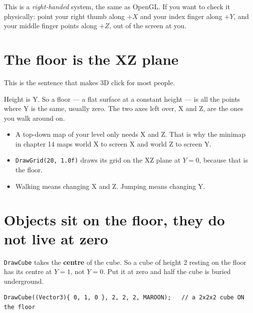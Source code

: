 This is a \emph{right-handed} system, the same as OpenGL. If you want to check it
physically: point your right thumb along $+X$ and your index finger along $+Y$,
and your middle finger points along $+Z$, out of the screen at you.


\section{The floor is the XZ plane}

This is the sentence that makes 3D click for most people.

Height is Y. So a floor --- a flat surface at a constant height --- is all the
points where Y is the same, usually zero. The two axes left over, X and Z, are
the ones you walk around on.

\begin{itemize}[leftmargin=*,itemsep=2pt]
  \item A top-down map of your level only needs X and Z. That is why the minimap
        in chapter 14 maps world X to screen X and world Z to screen Y.
  \item \lstinline|DrawGrid(20, 1.0f)| draws its grid on the XZ plane at
        $Y = 0$, because that is the floor.
  \item Walking means changing X and Z. Jumping means changing Y.
\end{itemize}


\section{Objects sit on the floor, they do not live at zero}

\lstinline|DrawCube| takes the \textbf{centre} of the cube. So a cube of height 2
resting on the floor has its centre at $Y = 1$, not $Y = 0$. Put it at zero and
half the cube is buried underground.

\begin{lstlisting}
DrawCube((Vector3){ 0, 1, 0 }, 2, 2, 2, MAROON);   // a 2x2x2 cube ON the floor
\end{lstlisting}


